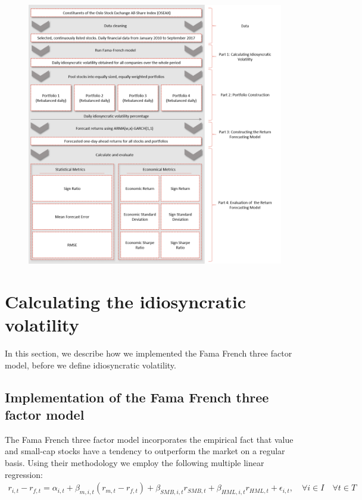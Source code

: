 \begin{figure}
\centering
  \centering
  \includegraphics[scale=0.5]{Pictures/FlowChart.png}
\end{figure}

\newpage
\section{Calculating the idiosyncratic volatility}

In this section, we describe how we implemented the Fama French three factor model, before we define idiosyncratic volatility.

\subsection{Implementation of the Fama French three factor model} The Fama French three factor model \cite{famafrench} incorporates the empirical fact that value and small-cap stocks have a tendency to outperform the market on a regular basis. Using their methodology we employ the following multiple linear regression:
\begin{align} 
    r_{i,t} - r_{f,t}= \alpha_{i,t} + \beta_{m,i,t}(r_{m,t} - r_{f,t}) + \beta_{SMB,i,t}r_{SMB,t} + \beta_{HML,i,t}r_{HML,t} + \epsilon_{i,t}, \quad  \forall i \in I \quad  \forall t \in T 
    \label{FFregression}
\end{align}

